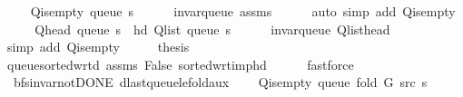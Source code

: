 \begin{isabellebody}
\ \ \isamarkupfalse%
\ {\isachardoublequoteopen}{\isasymnot}\ Q{\isacharunderscore}{\kern0pt}is{\isacharunderscore}{\kern0pt}empty\ {\isacharparenleft}{\kern0pt}queue\ s{\isacharparenright}{\kern0pt}{\isachardoublequoteclose}\isanewline
\ \ \ \ \isamarkupfalse%
\ invar{\isacharunderscore}{\kern0pt}queue\ assms\isanewline
\ \ \ \ \isamarkupfalse%
\ {\isacharparenleft}{\kern0pt}auto\ simp\ add{\isacharcolon}{\kern0pt}\ Q{\isachardot}{\kern0pt}is{\isacharunderscore}{\kern0pt}empty{\isacharparenright}{\kern0pt}\isanewline
\ \ \isamarkupfalse%
\ \isamarkupfalse%
\ {\isachardoublequoteopen}Q{\isacharunderscore}{\kern0pt}head\ {\isacharparenleft}{\kern0pt}queue\ s{\isacharparenright}{\kern0pt}\ {\isacharequal}{\kern0pt}\ hd\ {\isacharparenleft}{\kern0pt}Q{\isacharunderscore}{\kern0pt}list\ {\isacharparenleft}{\kern0pt}queue\ s{\isacharparenright}{\kern0pt}{\isacharparenright}{\kern0pt}{\isachardoublequoteclose}\isanewline
\ \ \ \ \isamarkupfalse%
\ invar{\isacharunderscore}{\kern0pt}queue\ Q{\isachardot}{\kern0pt}list{\isacharunderscore}{\kern0pt}head\isanewline
\ \ \ \ \isamarkupfalse%
\ {\isacharparenleft}{\kern0pt}simp\ add{\isacharcolon}{\kern0pt}\ Q{\isachardot}{\kern0pt}is{\isacharunderscore}{\kern0pt}empty{\isacharparenright}{\kern0pt}\isanewline
\ \ \isamarkupfalse%
\ \isamarkupfalse%
\ {\isacharquery}{\kern0pt}thesis\isanewline
\ \ \ \ \isamarkupfalse%
\ queue{\isacharunderscore}{\kern0pt}sorted{\isacharunderscore}{\kern0pt}wrt{\isacharunderscore}{\kern0pt}d\ assms\ False\ sorted{\isacharunderscore}{\kern0pt}wrt{\isacharunderscore}{\kern0pt}imp{\isacharunderscore}{\kern0pt}hd\isanewline
\ \ \ \ \isamarkupfalse%
\ fastforce\isanewline
{}\isamarkupfalse%
%
\endisatagproof
{\isafoldproof}%
%
\isadelimproof
\isanewline
%
\endisadelimproof
\isanewline
{}\isamarkupfalse%
\ {\isacharparenleft}{\kern0pt}\ bfs{\isacharunderscore}{\kern0pt}invar{\isacharunderscore}{\kern0pt}not{\isacharunderscore}{\kern0pt}DONE{\isacharparenright}{\kern0pt}\ d{\isacharunderscore}{\kern0pt}last{\isacharunderscore}{\kern0pt}queue{\isacharunderscore}{\kern0pt}le{\isacharunderscore}{\kern0pt}fold{\isacharunderscore}{\kern0pt}aux{\isacharunderscore}{\kern0pt}{}{\isacharcolon}{\kern0pt}\isanewline
\ \ \ {\isachardoublequoteopen}{\isasymnot}\ Q{\isacharunderscore}{\kern0pt}is{\isacharunderscore}{\kern0pt}empty\ {\isacharparenleft}{\kern0pt}queue\ {\isacharparenleft}{\kern0pt}fold\ G\ src\ s{\isacharparenright}{\kern0pt}{\isacharparenright}{\kern0pt}{\isachardoublequoteclose}\isanewline

\end{isabellebody}
